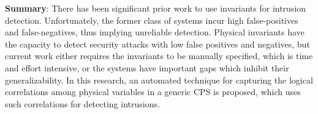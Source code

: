 \textbf{Summary}: There has been significant prior work to use invariants for intrusion detection. Unfortunately, the former class of systems incur high false-positives and false-negatives, thus implying unreliable detection. Physical invariants have the capacity to detect security attacks with low false positives and negatives, but current work either requires the invariants to be manually specified, which is time and effort intensive, or the systems have important gaps which inhibit their generalizability. In this research, an automated technique for capturing the logical correlations among physical variables in a generic CPS is proposed, which uses such correlations for detecting intrusions.

\endinput
